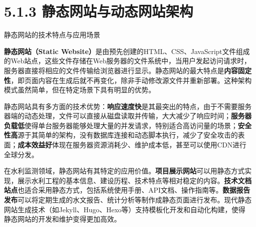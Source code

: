 \section{5.1.3 静态网站与动态网站架构}

 静态网站的技术特点与应用场景

\textbf{静态网站（Static Website）}是由预先创建的HTML、CSS、JavaScript文件组成的Web站点，这些文件存储在Web服务器的文件系统中，当用户发起访问请求时，服务器直接将相应的文件传输给浏览器进行显示。静态网站的最大特点是\textbf{内容固定性}，即页面内容在生成后就不再变化，除非手动修改源文件并重新部署。这种架构模式虽然简单，但在特定场景下具有明显的优势。

静态网站具有多方面的技术优势：\textbf{响应速度快}是其最突出的特点，由于不需要服务器端的动态处理，文件可以直接从磁盘读取并传输，大大减少了响应时间；\textbf{服务器负载低}使得单台服务器能够处理大量的并发请求，特别适合高访问量的场景；\textbf{安全性高}源于其简单的架构，没有数据库连接和动态脚本执行，减少了安全攻击的表面；\textbf{成本效益好}体现在服务器资源消耗少、维护成本低，甚至可以使用CDN进行全球分发。

在水利监测领域，静态网站有其特定的应用价值。\textbf{项目展示网站}可以用静态方式实现，展示水利工程的基本信息、建设历程、技术特点等相对稳定的内容。\textbf{技术文档站点}也适合采用静态方式，包括系统使用手册、API文档、操作指南等。\textbf{数据报告发布}可以将定期生成的水文报告、统计分析等制作成静态页面进行发布。现代静态网站生成技术（如Jekyll、Hugo、Hexo等）支持模板化开发和自动化构建，使得静态网站的开发和维护变得更加高效。

